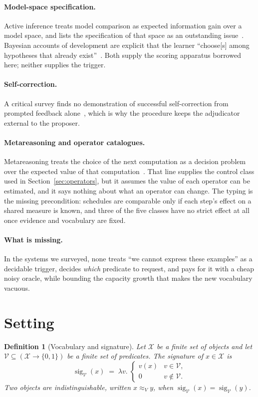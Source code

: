\documentclass[11pt]{article}
\newtheorem{definition}{Definition}
\newcommand{\sig}{\operatorname{sig}}
\newcommand{\Indist}{\approx_{V}}
\newcommand{\Vocab}{\mathcal{V}}
\newcommand{\dom}{\mathcal{X}}
\begin{document}
\paragraph{Model-space specification.} Active inference treats model comparison as expected
information gain over a model space, and lists the specification of that space as an outstanding
issue~\cite{friston2026}. Bayesian accounts of development are explicit that the learner
``choose[s] among hypotheses that already exist''~\cite{perfors2011}. Both supply the scoring
apparatus borrowed here; neither supplies the trigger.

\paragraph{Self-correction.} A critical survey finds no demonstration of successful
self-correction from prompted feedback alone~\cite{kamoi2024}, which is why the procedure keeps
the adjudicator external to the proposer.

\paragraph{Metareasoning and operator catalogues.} Metareasoning treats the choice of the next
computation as a decision problem over the expected value of that computation~\cite{russell1991}.
That line supplies the control class used in Section~\ref{sec:operators}, but it assumes the value of each
operator can be estimated, and it says nothing about what an operator can change. The typing is the
missing precondition: schedules are comparable only if each step's effect on a shared measure is
known, and three of the five classes have no strict effect at all once evidence and vocabulary are
fixed.

\paragraph{What is missing.} In the systems we surveyed, none treats ``we cannot express these
examples'' as a decidable trigger, decides \emph{which} predicate to request, and pays for it with a
cheap noisy oracle, while bounding the capacity growth that makes the new vocabulary vacuous.

\section{Setting}\label{sec:setting}

\begin{definition}[Vocabulary and signature]
Let $\dom$ be a finite set of objects and let $\Vocab \subseteq (\dom \to \{0,1\})$ be a finite
set of predicates. The \emph{signature} of $x \in \dom$ is
\[
  \sig_{\Vocab}(x) \;=\; \lambda v.\; \begin{cases} v(x) & v \in \Vocab,\\ 0 & v \notin \Vocab.\end{cases}
\]
Two objects are \emph{indistinguishable}, written $x \Indist y$, when
$\sig_{\Vocab}(x) = \sig_{\Vocab}(y)$.
\end{definition}
\end{document}
